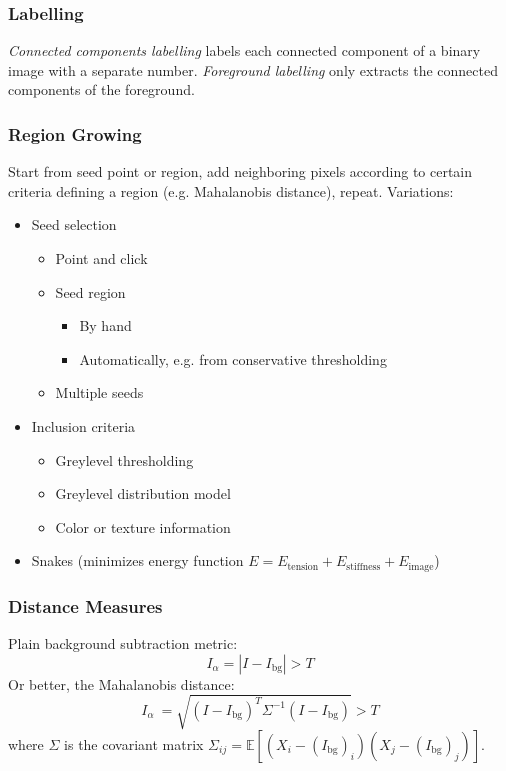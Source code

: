 \documentclass[a4paper,10pt]{article}
\begin{document}
\subsubsection{Labelling} \emph{Connected components labelling} labels each connected component of a binary image with a separate number. \emph{Foreground labelling} only extracts the connected components of the foreground.

\subsubsection{Region Growing} Start from seed point or region, add neighboring pixels according to certain criteria defining a region (e.g. Mahalanobis distance), repeat. Variations:
\begin{itemize}
    \item Seed selection
    \begin{itemize}
        \item Point and click
        \item Seed region
        \begin{itemize}
            \item By hand
            \item Automatically, e.g. from conservative thresholding
        \end{itemize}
        \item Multiple seeds
    \end{itemize}
    \item Inclusion criteria
    \begin{itemize}
        \item Greylevel thresholding
        \item Greylevel distribution model
        \item Color or texture information
    \end{itemize}
    \item Snakes (minimizes energy function \(E = E_\text{tension} + E_\text{stiffness} + E_\text{image}\))
\end{itemize}

\subsubsection{Distance Measures}
Plain background subtraction metric:
\[I_\alpha = |I - I_\text{bg}| > T\]
Or better, the Mahalanobis distance:
\[I_\alpha\ = \sqrt{(I - I_\text{bg})^T \Sigma^{-1} (I - I_\text{bg})} > T\]
where \(\Sigma\) is the covariant matrix \(\Sigma_{ij} = \mathbb{E}[(X_i - (I_\text{bg})_i)(X_j - (I_\text{bg})_j)]\).
\end{document}
